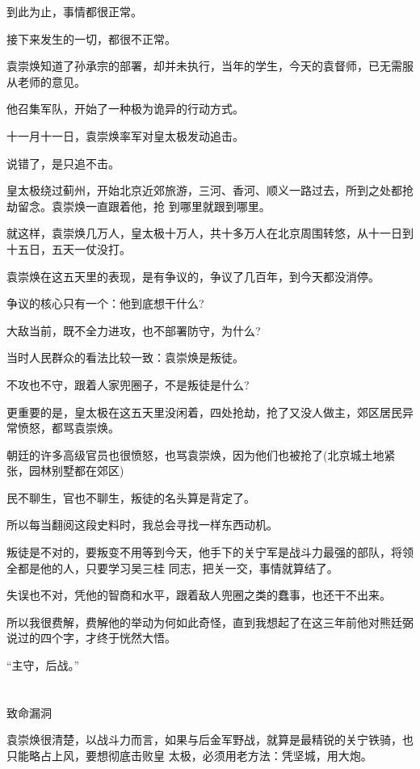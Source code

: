 \documentclass[11pt,a4paper,onecolumn]{article}
\begin{document}
到此为止，事情都很正常。

接下来发生的一切，都很不正常。

袁崇焕知道了孙承宗的部署，却并未执行，当年的学生，今天的袁督师，已无需服从老师的意见。

他召集军队，开始了一种极为诡异的行动方式。

十一月十一日，袁崇焕率军对皇太极发动追击。

说错了，是只追不击。

皇太极绕过蓟州，开始北京近郊旅游，三河、香河、顺义一路过去，所到之处都抢劫留念。袁崇焕一直跟着他，抢
到哪里就跟到哪里。

就这样，袁崇焕几万人，皇太极十万人，共十多万人在北京周围转悠，从十一日到十五日，五天一仗没打。

袁崇焕在这五天里的表现，是有争议的，争议了几百年，到今天都没消停。

争议的核心只有一个：他到底想干什么?

大敌当前，既不全力进攻，也不部署防守，为什么?

当时人民群众的看法比较一致：袁崇焕是叛徒。

不攻也不守，跟着人家兜圈子，不是叛徒是什么?

更重要的是，皇太极在这五天里没闲着，四处抢劫，抢了又没人做主，郊区居民异常愤怒，都骂袁崇焕。

朝廷的许多高级官员也很愤怒，也骂袁崇焕，因为他们也被抢了(北京城土地紧张，园林别墅都在郊区)

民不聊生，官也不聊生，叛徒的名头算是背定了。

所以每当翻阅这段史料时，我总会寻找一样东西\myrule 动机。

叛徒是不对的，要叛变不用等到今天，他手下的关宁军是战斗力最强的部队，将领全都是他的人，只要学习吴三桂
同志，把关一交，事情就算结了。

失误也不对，凭他的智商和水平，跟着敌人兜圈之类的蠢事，也还干不出来。

所以我很费解，费解他的举动为何如此奇怪，直到我想起了在这三年前他对熊廷弼说过的四个字，才终于恍然大悟。

``主守，后战。''

\section[\thesection]{}

致命漏洞

袁崇焕很清楚，以战斗力而言，如果与后金军野战，就算是最精锐的关宁铁骑，也只能略占上风，要想彻底击败皇
太极，必须用老方法：凭坚城，用大炮。
\end{document}
